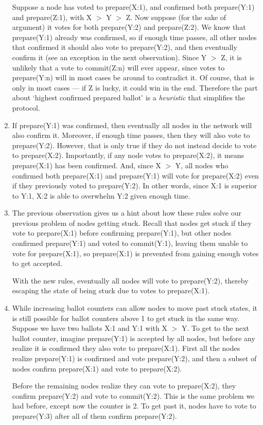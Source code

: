 \begin{enumerate}
    Suppose a node has voted to prepare(X:1), and confirmed both prepare(Y:1) and prepare(Z:1), with X $>$ Y $>$ Z. Now suppose (for the sake of argument) it votes for both prepare(Y:2) and prepare(Z:2). We know that prepare(Y:1) already was confirmed, so if enough time passes, all other nodes that confirmed it should also vote to prepare(Y:2), and then eventually confirm it (see an exception in the next observation). Since Y $>$ Z, it is unlikely that a vote to commit(Z:n) will ever appear, since votes to prepare(Y:n) will in most cases be around to contradict it. Of course, that is only in most cases --- if Z is lucky, it could win in the end. Therefore the part about `highest confirmed prepared ballot' is a {\em heuristic} that simplifies the protocol.

    \item If prepare(Y:1) was confirmed, then eventually all nodes in the network will also confirm it. Moreover, if enough time passes, then they will also vote to prepare(Y:2). However, that is only true if they do not instead decide to vote to prepare(X:2). Importantly, if any node votes to prepare(X:2), it means prepare(X:1) has been confirmed. And, since X $>$ Y, all nodes who confirmed both prepare(X:1) and prepare(Y:1) will vote for prepare(X:2) even if they previously voted to prepare(Y:2). In other words, since X:1 is superior to Y:1, X:2 is able to overwhelm Y:2 given enough time.

    \item The previous observation gives us a hint about how these rules solve our previous problem of nodes getting stuck. Recall that nodes get stuck if they vote to prepare(X:1) before confirming prepare(Y:1), but other nodes confirmed prepare(Y:1) and voted to commit(Y:1), leaving them unable to vote for prepare(X:1), so prepare(X:1) is prevented from gaining enough votes to get accepted.

    With the new rules, eventually all nodes will vote to prepare(Y:2), thereby escaping the state of being stuck due to votes to prepare(X:1).

    \item While increasing ballot counters can allow nodes to move past stuck states, it is still possible for ballot counters above 1 to get stuck in the same way. Suppose we have two ballots X:1 and Y:1 with X $>$ Y. To get to the next ballot counter, imagine prepare(Y:1) is accepted by all nodes, but before any realize it is confirmed they also vote to prepare(X:1). First all the nodes realize prepare(Y:1) is confirmed and vote prepare(Y:2), and then a subset of nodes confirm prepare(X:1) and vote to prepare(X:2).

    Before the remaining nodes realize they can vote to prepare(X:2), they confirm prepare(Y:2) and vote to commit(Y:2). This is the same problem we had before, except now the counter is 2. To get past it, nodes have to vote to prepare(Y:3) after all of them confirm prepare(Y:2).
\end{enumerate}

